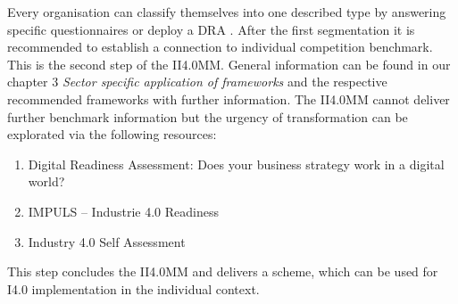 Every organisation can classify themselves into one described type by answering specific questionnaires or deploy a \ac{DRA} \cite{Schumacher2016161} \cite{ReadinessIndustrie40Impulse} \cite{i40-self-assessment-PwC:2016}. After the first segmentation it is recommended to establish a connection to individual competition benchmark. This is the second step of the \ac{II4.0MM}. General information can be found in our chapter 3 \emph{Sector specific application of frameworks} and the respective recommended frameworks with further information. The \ac{II4.0MM} cannot deliver further benchmark information but the urgency of transformation can be explorated via the following resources:
\begin{enumerate}
\item Digital Readiness Assessment: Does your business strategy work in a digital world? \cite{ey-dra}
\item IMPULS – Industrie 4.0 Readiness \cite{ReadinessIndustrie40Impulse}
\item Industry 4.0 Self Assessment \cite{i40-self-assessment-PwC:2016}
\end{enumerate}

This step concludes the \ac{II4.0MM} and delivers a scheme, which can be used for \ac{I4.0} implementation in the individual context.